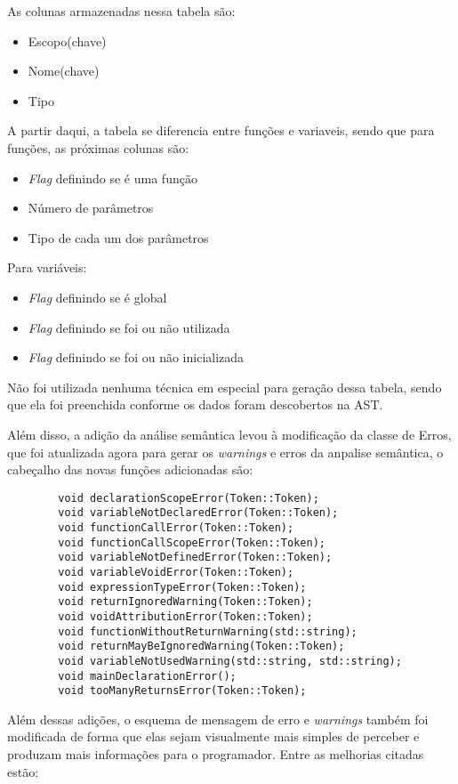 \documentclass[12pt,a4paper,final]{article}
\begin{document}
As colunas armazenadas nessa tabela são:
\begin{itemize}
\item Escopo(chave)
\item Nome(chave)
\item Tipo
\end{itemize}
A partir daqui, a tabela se diferencia entre funções e variaveis, sendo que para funções, as próximas colunas são:
\begin{itemize}
\item \textit{Flag} definindo se é uma função
\item Número de parâmetros
\item Tipo de cada um dos parâmetros
\end{itemize}
Para variáveis:
\begin{itemize}
\item \textit{Flag} definindo se é global
\item \textit{Flag} definindo se foi ou não utilizada
\item \textit{Flag} definindo se foi ou não inicializada
\end{itemize}

Não foi utilizada nenhuma técnica em especial para geração dessa tabela, sendo que ela foi preenchida conforme os dados foram descobertos na AST.

Além disso, a adição da análise semântica levou à modificação da classe de Erros, que foi atualizada agora para gerar os \textit{warnings} e erros da anpalise semântica, o cabeçalho das novas funções adicionadas são:

\begin{lstlisting}
        void declarationScopeError(Token::Token);
        void variableNotDeclaredError(Token::Token);
        void functionCallError(Token::Token);
        void functionCallScopeError(Token::Token);
        void variableNotDefinedError(Token::Token);
        void variableVoidError(Token::Token);
        void expressionTypeError(Token::Token);
        void returnIgnoredWarning(Token::Token);
        void voidAttributionError(Token::Token);
        void functionWithoutReturnWarning(std::string);
        void returnMayBeIgnoredWarning(Token::Token);
        void variableNotUsedWarning(std::string, std::string);
        void mainDeclarationError();
        void tooManyReturnsError(Token::Token);
\end{lstlisting}

Além dessas adições, o esquema de mensagem de erro e \textit{warnings} também foi modificada de forma que elas sejam visualmente mais simples de perceber e produzam mais informações para o programador. Entre as melhorias citadas estão:
\end{document}
